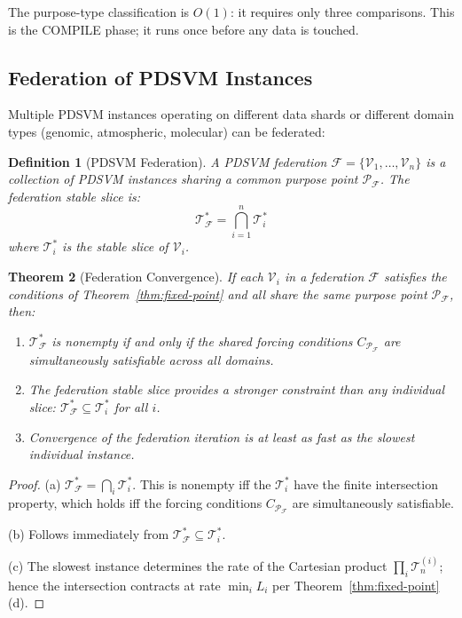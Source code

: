\documentclass[10pt,twocolumn]{article}
\newtheorem{theorem}{Theorem}[section]
\newtheorem{definition}[theorem]{Definition}
\newcommand{\TruthCell}{\mathcal{T}}
\newcommand{\PurposePoint}{\mathcal{P}}
\begin{document}
The purpose-type classification is $O(1)$: it requires only three comparisons.
This is the COMPILE phase; it runs once before any data is touched.

\subsection{Federation of PDSVM Instances}

Multiple PDSVM instances operating on different data shards or different
domain types (genomic, atmospheric, molecular) can be federated:

\begin{definition}[PDSVM Federation]
\label{def:federation}
A \emph{PDSVM federation} $\mathcal{F} = \{\mathcal{V}_1, \ldots, \mathcal{V}_n\}$
is a collection of PDSVM instances sharing a common purpose point
$\PurposePoint_\mathcal{F}$. The \emph{federation stable slice} is:
\begin{equation}
\TruthCell^*_\mathcal{F} = \bigcap_{i=1}^n \TruthCell^*_i
\label{eq:federation-slice}
\end{equation}
where $\TruthCell^*_i$ is the stable slice of $\mathcal{V}_i$.
\end{definition}

\begin{theorem}[Federation Convergence]
\label{thm:federation}
If each $\mathcal{V}_i$ in a federation $\mathcal{F}$ satisfies the
conditions of Theorem~\ref{thm:fixed-point} and all share the same
purpose point $\PurposePoint_\mathcal{F}$, then:
\begin{enumerate}[label=(\alph*)]
\item $\TruthCell^*_\mathcal{F}$ is nonempty if and only if the
      shared forcing conditions $C_{\PurposePoint_\mathcal{F}}$
      are simultaneously satisfiable across all domains.
\item The federation stable slice provides a stronger constraint
      than any individual slice:
      $\TruthCell^*_\mathcal{F} \subseteq \TruthCell^*_i$ for all $i$.
\item Convergence of the federation iteration is at least as fast as
      the slowest individual instance.
\end{enumerate}
\end{theorem}

\begin{proof}
(a) $\TruthCell^*_\mathcal{F} = \bigcap_i \TruthCell^*_i$.
This is nonempty iff the $\TruthCell^*_i$ have the finite intersection property,
which holds iff the forcing conditions $C_{\PurposePoint_\mathcal{F}}$
are simultaneously satisfiable.

(b) Follows immediately from $\TruthCell^*_\mathcal{F} \subseteq \TruthCell^*_i$.

(c) The slowest instance determines the rate of the Cartesian product
$\prod_i \TruthCell_n^{(i)}$; hence the intersection contracts
at rate $\min_i L_i$ per Theorem~\ref{thm:fixed-point}(d).
\end{proof}
\end{document}
